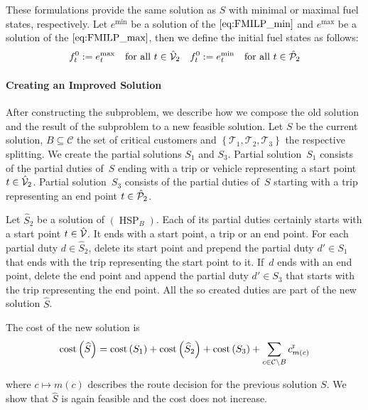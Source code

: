These formulations provide the same solution as $S$ with minimal or maximal fuel states, respectively. Let $e^{\min}$ be a solution of the $\eqref{eq:FMILP_min}$ and $e^{\max}$ be a solution of the $\eqref{eq:FMILP_max}$, then we define the initial fuel states as follows:
\begin{align*}
	f^0_t := e^{\max}_t && \text{for all } t\in\hat{\mathcal{V}}_2 && f^0_t := e^{\min}_t && \text{for all } t\in\hat{\mathcal{P}}_2
\end{align*}

\paragraph{Creating an Improved Solution} \parfill

After constructing the subproblem, we describe how we compose the old solution and the result of the subproblem to a new feasible solution. Let $S$ be the current solution, $B\subseteq\mathcal{C}$ the set of critical customers and $\left\{\mathcal{T}_1,\mathcal{T}_2,\mathcal{T}_3\right\}$ the respective splitting. We create the partial solutions $S_1$ and $S_3$. Partial solution~$S_1$ consists of the partial duties of~$S$ ending with a trip or vehicle representing a start point ${t\in\hat{\mathcal{V}}_2}$. Partial solution~$S_3$ consists of the partial duties of~$S$ starting with a trip representing an end point ${t\in\hat{\mathcal{P}}_2}$. 

Let $\widehat{S}_2$ be a solution of $(\operatorname{HSP}_B)$. Each of its partial duties certainly starts with a start point ${t\in\hat{\mathcal{V}}}$. It ends with a start point, a trip or an end point. For each partial duty ${d\in\widehat{S}_2}$, delete its start point and prepend the partial duty ${d'\in S_1}$ that ends with the trip representing the start point to it. If~$d$ ends with an end point, delete the end point and append the partial duty ${d'\in S_3}$ that starts with the trip representing the end point. All the so created duties are part of the new solution $\widehat{S}$. 

The cost of the new solution is
\begin{align*}
	\operatorname{cost}\left(\widehat{S}\right) = \operatorname{cost}\left(S_1\right) + \operatorname{cost}\left(\widehat{S}_2\right) + \operatorname{cost}\left(S_3\right) + \sum_{c\in\mathcal{C}\backslash B} c^{\operatorname{r}}_{m(c)}
\end{align*}

where ${c\mapsto m(c)}$ describes the route decision for the previous solution $S$. We show that $\widehat{S}$ is again feasible and the cost does not increase.

